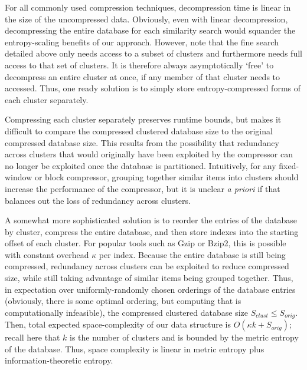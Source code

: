 \documentclass[review,preprint,12pt]{elsarticle}
\theoremstyle{definition}
\theoremstyle{remark}
\begin{document}
For all commonly used compression techniques, decompression time is linear in the size of the uncompressed data.
Obviously, even with linear decompression, decompressing the entire database for each similarity search would squander the entropy-scaling benefits of our
approach.
However, note that the fine search detailed above only needs access to a subset of clusters and furthermore needs full access to that set of clusters.
It is therefore always asymptotically `free' to decompress an entire cluster at once, if any member of that cluster needs to accessed.
Thus, one ready solution is to simply store entropy-compressed forms of each cluster separately.

Compressing each cluster separately preserves runtime bounds, but makes it difficult to compare the compressed clustered database size to the original compressed database size.
This results from the possibility that redundancy across clusters that would originally have been exploited by the compressor can no longer be exploited 
once the database is partitioned.
Intuitively, for any fixed-window or block compressor, grouping together similar items into clusters should increase the performance of the compressor, but it is unclear \textit{a priori} if that balances out the loss of redundancy across clusters.

A somewhat more sophisticated solution is to reorder the entries of the database by cluster, compress the entire database, and then store indexes into the starting offset of each cluster.
For popular tools such as Gzip or Bzip2, this is possible with constant overhead $\kappa$ per index.
Because the entire database is still being compressed, redundancy across clusters can be exploited to reduce compressed size, while still taking advantage of similar items being grouped together.
Thus, in expectation over uniformly-randomly chosen orderings of the database entries (obviously, there is some optimal ordering, but computing that is computationally infeasible), the compressed clustered database size $S_{clust} \le S_{orig}$.
Then, total expected space-complexity of our data structure is $O(\kappa k + S_{orig})$; recall here that $k$ is the number of clusters and is bounded by the metric entropy of the database.
Thus, space complexity is linear in metric entropy plus information-theoretic entropy.
\end{document}

